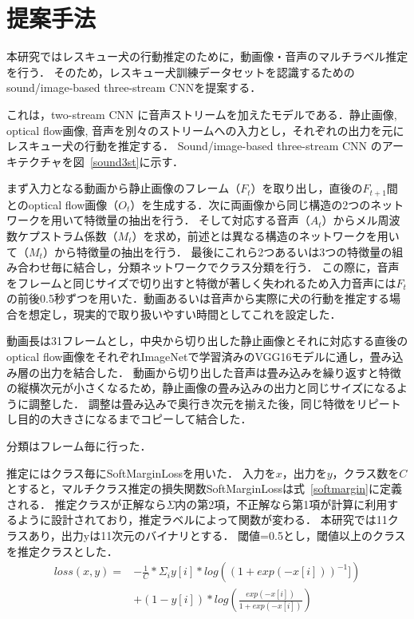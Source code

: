 \documentclass[MIRU,submit]{miru2019j}
\begin{document}
\section{提案手法}
本研究ではレスキュー犬の行動推定のために，動画像・音声のマルチラベル推定を行う．
そのため，レスキュー犬訓練データセットを認識するためのsound/image-based three-stream CNNを提案する．

これは，two-stream CNN に音声ストリームを加えたモデルである．静止画像, optical flow画像, 音声を別々のストリームへの入力とし，それぞれの出力を元にレスキュー犬の行動を推定する．
Sound/image-based three-stream CNN のアーキテクチャを図~\ref{sound3st}に示す．

まず入力となる動画から静止画像のフレーム（$F_t$）を取り出し，直後の$F_{t+1}$間とのoptical flow画像（$O_t$）を生成する．次に両画像から同じ構造の2つのネットワークを用いて特徴量の抽出を行う．
そして対応する音声（$A_t$）からメル周波数ケプストラム係数（$M_t$）を求め，前述とは異なる構造のネットワークを用いて（$M_t$）から特徴量の抽出を行う．
最後にこれら2つあるいは3つの特徴量の組み合わせ毎に結合し，分類ネットワークでクラス分類を行う．
この際に，音声をフレームと同じサイズで切り出すと特徴が著しく失われるため入力音声には$F_t$の前後0.5秒ずつを用いた．動画あるいは音声から実際に犬の行動を推定する場合を想定し，現実的で取り扱いやすい時間としてこれを設定した．

動画長は31フレームとし，中央から切り出した静止画像とそれに対応する直後のoptical flow画像をそれぞれImageNetで学習済みのVGG16モデルに通し，畳み込み層の出力を結合した．
動画から切り出した音声は畳み込みを繰り返すと特徴の縦横次元が小さくなるため，静止画像の畳み込みの出力と同じサイズになるように調整した．
調整は畳み込みで奥行き次元を揃えた後，同じ特徴をリピートし目的の大きさになるまでコピーして結合した．

分類はフレーム毎に行った．

推定にはクラス毎にSoftMarginLossを用いた．
入力を$x$，出力を$y$，クラス数を$C$とすると，マルチクラス推定の損失関数SoftMarginLossは式~\ref{softmargin}に定義される．
推定クラスが正解なら$\Sigma$内の第2項，不正解なら第1項が計算に利用するように設計されており，推定ラベルによって関数が変わる．
本研究では11クラスあり，出力yは11次元のバイナリとする．
閾値=0.5とし，閾値以上のクラスを推定クラスとした．
\begin{equation}
    \label{softmargin}
    \begin{split}
    loss(x, y) = &-\frac{1}{C} * \Sigma_{i} y[i] * log((1+exp(-x[i]))^{-1}])\\
    &+ (1 - y[i]) * log(\frac{exp(-x[i])}{1+exp(-x[i])})
    \end{split}
\end{equation}
\end{document}
